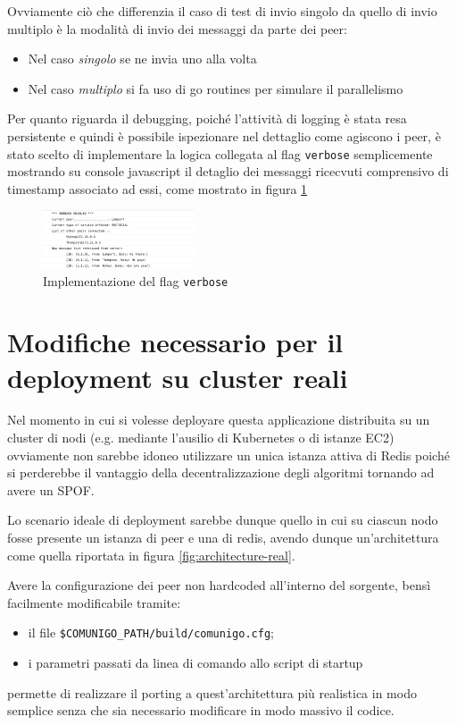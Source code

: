 \documentclass[conference]{IEEEtran}
\begin{document}
Ovviamente ciò che differenzia il caso di test di invio singolo da quello di invio multiplo è la modalità di invio dei messaggi da parte dei peer:
\begin{itemize}
\item Nel caso \textsl{singolo} se ne invia uno alla volta
\item Nel caso \textsl{multiplo} si fa uso di go routines per simulare il parallelismo
\end{itemize}

Per quanto riguarda il debugging, poiché l'attività di logging è stata resa persistente e quindi è possibile ispezionare nel dettaglio come agiscono i peer, è stato scelto di implementare la logica collegata al flag \texttt{verbose} semplicemente mostrando su console javascript il detaglio dei messaggi ricecvuti comprensivo di timestamp associato ad essi, come mostrato in figura \ref{fig:debug}

\begin{figure}[htbp]
\centerline{\includegraphics[width=0.4\textwidth]{figs/debug.png}}
\caption{Implementazione del flag \texttt{verbose}}
\label{fig:debug}
\end{figure}

\section{Modifiche necessario per il deployment su cluster reali}
Nel momento in cui si volesse deployare questa applicazione distribuita su un cluster di nodi (e.g. mediante l'ausilio di Kubernetes o di istanze EC2) ovviamente non sarebbe idoneo utilizzare un unica istanza attiva di Redis poiché si perderebbe il vantaggio della decentralizzazione degli algoritmi tornando ad avere un SPOF.

Lo scenario ideale di deployment sarebbe dunque quello in cui su ciascun nodo fosse presente un istanza di peer e una di redis, avendo dunque un'architettura come quella riportata in figura \ref{fig:architecture-real}.

Avere la configurazione dei peer non hardcoded all'interno del sorgente, bensì facilmente modificabile tramite:
\begin{itemize}
\item il file \texttt{\$COMUNIGO\_PATH/build/comunigo.cfg};
\item i parametri passati da linea di comando allo script di startup
\end{itemize}
permette di realizzare il porting a quest'architettura più realistica in modo semplice senza che sia necessario modificare in modo massivo il codice.
\end{document}
